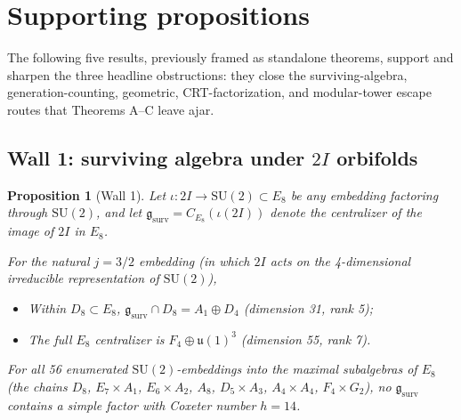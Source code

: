 \documentclass[11pt,a4paper]{amsart}
\newtheorem{proposition}[theorem]{Proposition}
\theoremstyle{definition}
\theoremstyle{remark}
\newcommand{\SU}{\mathrm{SU}}
\newcommand{\frakg}{\mathfrak{g}}
\newcommand{\fraku}{\mathfrak{u}}
\begin{document}
\section{Supporting propositions}\label{sec:supporting}

The following five results, previously framed as standalone theorems,
support and sharpen the three headline obstructions: they close the
surviving-algebra, generation-counting, geometric, CRT-factorization, and
modular-tower escape routes that Theorems A--C leave ajar.

\subsection{Wall 1: surviving algebra under $2I$ orbifolds}

\begin{proposition}[Wall 1]\label{thm:wall1}
Let $\iota: 2I \to \SU(2) \subset E_8$ be any embedding factoring through
$\SU(2)$, and let $\frakg_{\mathrm{surv}} = C_{E_8}(\iota(2I))$ denote the
centralizer of the image of $2I$ in $E_8$.

For the natural $j = 3/2$ embedding (in which $2I$ acts on the 4-dimensional
irreducible representation of $\SU(2)$),
\begin{itemize}
  \item Within $D_8 \subset E_8$, $\frakg_{\mathrm{surv}} \cap D_8 = A_1 \oplus D_4$
    (dimension 31, rank 5);
  \item The full $E_8$ centralizer is $F_4 \oplus \fraku(1)^3$ (dimension 55,
    rank 7).
\end{itemize}

For all 56 enumerated $\SU(2)$-embeddings into the maximal subalgebras of $E_8$
(the chains $D_8$, $E_7 \times A_1$, $E_6 \times A_2$, $A_8$, $D_5 \times A_3$,
$A_4 \times A_4$, $F_4 \times G_2$), no $\frakg_{\mathrm{surv}}$ contains a
simple factor with Coxeter number $h = 14$.
\end{proposition}
\end{document}
